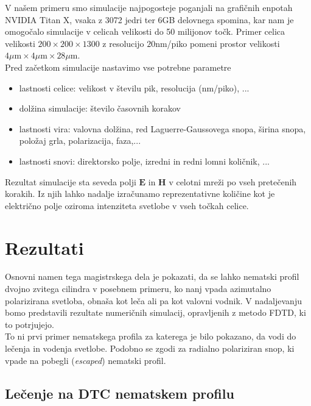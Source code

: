 \documentclass[longbibliography,slovene,a4paper,12pt]{book}
\begin{document}
V našem primeru smo simulacije najpogosteje poganjali na grafičnih enpotah NVIDIA Titan X, vsaka z 3072 jedri ter 6GB delovnega spomina, kar nam je omogočalo simulacije v celicah velikosti do 50 milijonov točk. Primer celica velikosti $200\times200\times 1300$ z resolucijo $20$nm/piko pomeni prostor velikosti $4\mu \text{m}\times 4\mu \text{m} \times 28 \mu\text{m}$.\\

Pred začetkom simulacije nastavimo vse potrebne parametre
\begin{itemize}
\item{lastnosti celice: velikost v številu pik, resolucija (nm/piko), ...}
\item{dolžina simulacije: število časovnih korakov}
\item{lastnosti vira: valovna dolžina, red Laguerre-Gaussovega snopa, širina snopa, položaj grla, polarizacija, faza,...}
\item{lastnosti snovi: direktorsko polje, izredni in redni lomni količnik, ...}
\end{itemize}
Rezultat simulacije sta seveda polji $\mathbf{E}$ in $\mathbf{H}$ v celotni mreži po vseh pretečenih korakih. Iz njih lahko nadalje izračunamo reprezentativne količine kot je električno polje oziroma intenziteta svetlobe v vseh točkah celice.\\

\chapter{Rezultati}

Osnovni namen tega magistrskega dela je pokazati, da se lahko nematski profil dvojno zvitega cilindra v posebnem primeru, ko nanj vpada azimutalno polarizirana svetloba, obnaša kot leča ali pa kot valovni vodnik. V nadaljevanju bomo predstavili rezultate numeričnih simulacij, opravljenih z metodo FDTD, ki to potrjujejo. \\

To ni prvi primer nematskega profila za katerega je bilo pokazano, da vodi do lečenja in vodenja svetlobe. Podobno se zgodi za radialno polariziran snop, ki vpade na pobegli (\emph{escaped}) nematski profil\cite{cancula,cancula3}.

\section{Lečenje na DTC nematskem profilu}
\end{document}
